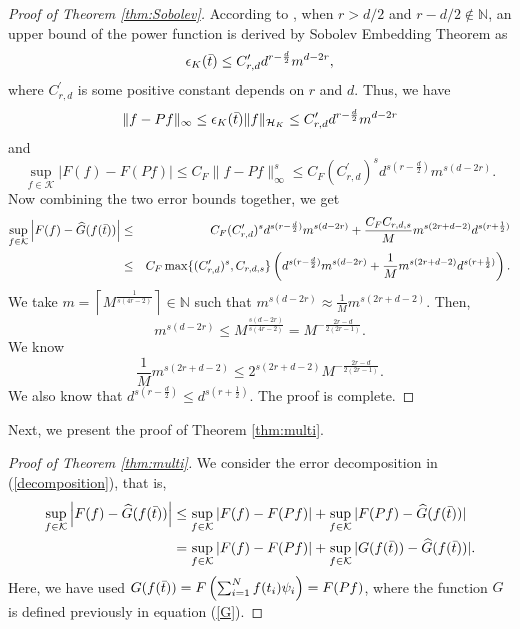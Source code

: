 \documentclass{article}
\def\NN{\mathbb N}
\numberwithin{equation}{section}
\begin{document}
\begin{appendices}
\begin{proof}[Proof of Theorem \ref{thm:Sobolev}]
   According to \citep{schaback1997reconstruction}, when $r>d/2$ and $r-d/2 \notin \NN$, an upper bound of the power function is derived by Sobolev Embedding Theorem as 
   \begin{equation*}
     \epsilon_K(\Bar{t})  \leq C^\prime_{r,d}d^{r-\frac{d}{2}}m^{d-2r},
   \end{equation*}
   where $C^\prime_{r,d}$ is some positive constant depends on $r$ and $d$. Thus, we have 
   \begin{equation*}
      \|f-Pf\|_\infty \leq \epsilon_K(\Bar{t})\|f\|_{\mathcal{H}_K} \leq C^\prime_{r,d}d^{r-\frac{d}{2}}m^{d-2r}
   \end{equation*} 
   and 
   \begin{equation*}
      \sup_{f\in \mathcal{K}}| F(f) - F(Pf)| \leq  C_F \|f-Pf\|^s_\infty \leq  C_F  (C^\prime_{r,d})^s d^{s(r-\frac{d}{2})}m^{s(d-2r)}. 
   \end{equation*}
   Now combining the two error bounds together, we get 
   \begin{eqnarray*}      \sup_{f\in \mathcal{K}}\left| F(f) - \widehat{G}(f(\Bar{t}))\right| &\leq& C_F (C^\prime_{r,d})^s d^{s(r-\frac{d}{2})}m^{s(d-2r)} + \frac{C_FC_{r,d,s}}{M}m^{s(2r+d-2)} d^{s(r+\frac{1}{2})}\\
       &\leq& C_F \max\{(C^\prime_{r,d})^s, C_{r,d,s} \}\left(d^{s(r-\frac{d}{2})}m^{s(d-2r)} + \frac{1}{M}m^{s(2r+d-2)} d^{s(r+\frac{1}{2})}\right).     
   \end{eqnarray*}
    We take $m=\left\lceil M^{\frac{1}{s(4r-2)}}\right\rceil \in \NN$ such that  $m^{s(d-2r)} \approx \frac{1}{M} m^{s(2r+d-2)}$.
  Then,
   \begin{equation*}
       m^{s(d-2r)} \leq M^{\frac{s(d-2r)}{s(4r-2)}} =  M^{-\frac{2r-d}{2(2r-1)}}.
   \end{equation*}
   We know $$\frac{1}{M} m^{s(2r+d-2)} \leq  2 ^{s(2r+d-2)}M^{-\frac{2r-d}{2(2r-1)}}.$$
   We also know that $d^{s(r-\frac{d}{2})} \leq d^{s(r+\frac{1}{2})}$. The proof is complete. 
\end{proof}

Next, we present the proof of Theorem \ref{thm:multi}.

\begin{proof}[Proof of Theorem \ref{thm:multi}]
We consider the error decomposition in (\ref{decomposition}), that is, 
\begin{eqnarray*}
    \sup_{f\in \mathcal{K}}\left| F(f) - \widehat{G}(f(\Bar{t}))\right| &\leq  \sup_{f\in \mathcal{K}}| F(f) - F(Pf)| +  \sup_{f\in \mathcal{K}}|F(Pf) - \widehat{G}(f(\Bar{t}))| \\
    &=  \sup_{f\in \mathcal{K}}| F(f) - F(Pf)| +  \sup_{f\in \mathcal{K}}|G(f(\Bar{t})) - \widehat{G}(f(\Bar{t}))|.
\end{eqnarray*}
Here, we have used $G(f(\Bar{t})) = F\left(\sum_{i=1}^N f(t_i) \psi_i\right) = F(Pf)$, where the function $G$ is defined previously in equation (\ref{G}). 


\end{proof}
\end{appendices}
\end{document}
